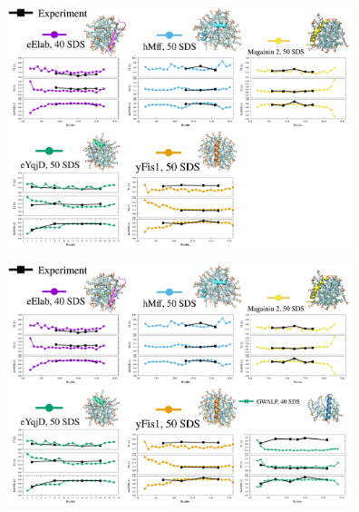 \documentclass{beamer}
\begin{document}
\addtocounter{framenumber}{-1}
\begin{frame}
\begin{center}


\vspace{0.5cm}


\includegraphics[height=7cm]{all_pep4.pdf}
\end{center}
\end{frame}


\addtocounter{framenumber}{-1}
\begin{frame}
\begin{center}


\vspace{0.5cm}


\includegraphics[height=7cm]{all_pep3.pdf}
\end{center}
\end{frame}
\end{document}
